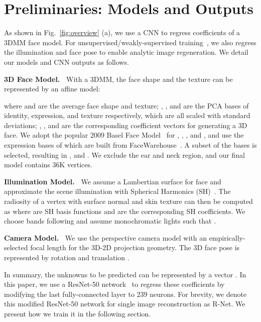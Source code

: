 \documentclass[10pt,twocolumn,letterpaper]{article}
\begin{document}
\section{Preliminaries: Models and Outputs}

As shown in Fig.~\ref{fig:overview} (a), we use a CNN to regress coefficients of a 3DMM face model. For unsupervised/weakly-supervised training~\cite{tewari2017mofa,tewari2018self}, we also regress the illumination and face pose to enable analytic image regeneration. We detail our models and CNN outputs as follows.


\vspace{6pt}
\noindent\textbf{3D Face Model.~}
With a 3DMM, the face shape  and the texture  can be represented by an affine model:

where  and  are the average face shape and texture; ,  , and  are the PCA bases of identity, expression, and texture respectively, which are all scaled with standard deviations; , , and  are the corresponding coefficient vectors for generating a 3D face. We adopt the popular 2009 Basel Face Model~\cite{paysan20093d} for , , , and , and use the expression bases  of \cite{guo2018cnn} which are built from FaceWarehouse~\cite{cao2014facewarehouse}. A subset of the bases is selected, resulting in ,  and . We exclude the ear and neck region, and our final model contains 36K vertices.

\vspace{6pt}
\noindent\textbf{Illumination Model.~}
We assume a Lambertian surface for face and approximate the scene illumination with Spherical Harmonics (SH)~\cite{ramamoorthi2001efficient,ramamoorthi2001signal}. The radiosity of a vertex  with surface normal  and skin texture  can then be computed as 
where  are SH basis functions and  are the corresponding SH coefficients. We choose  bands following \cite{tewari2017mofa,tewari2018self} and assume monochromatic lights such that .

\vspace{6pt}
\noindent\textbf{Camera Model.~} We use the perspective camera model with an empirically-selected focal length for the 3D-2D projection geometry. The 3D face pose  is represented by rotation  and translation .

In summary, the unknowns to be predicted can be represented by a vector
.
In this paper, we use a ResNet-50 network~\cite{he2016deep} to regress these coefficients by modifying the last fully-connected layer to 239 neurons. For brevity, we denote this modified ResNet-50 network for single image reconstruction as R-Net. We present how we train it in the following section.
\end{document}
